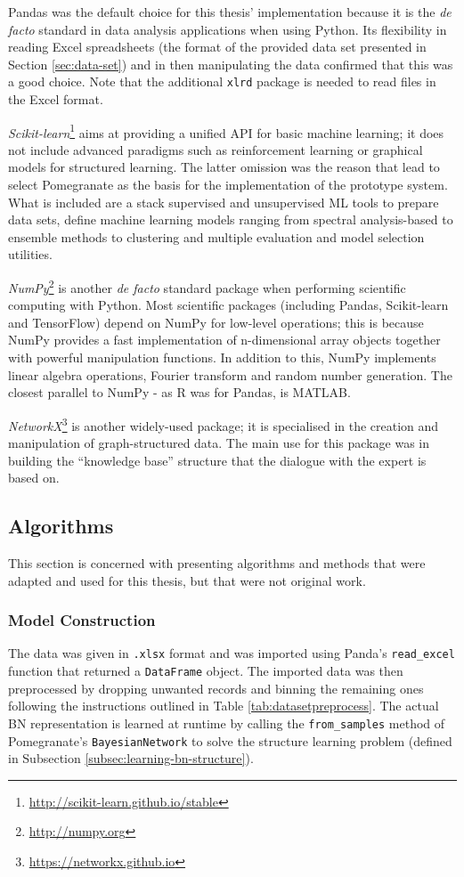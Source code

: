 Pandas was the default choice for this thesis' implementation because it is the \textit{de facto} standard in data analysis applications when using Python.
Its flexibility in reading Excel spreadsheets (the format of the provided data set presented in Section \ref{sec:data-set}) and in then manipulating the data confirmed that this was a good choice.
Note that the additional \texttt{xlrd} package is needed to read files in the Excel format.

\textit{Scikit-learn}\footnote{\url{http://scikit-learn.github.io/stable}} aims at providing a unified API for basic machine learning; it does not include advanced paradigms such as reinforcement learning or graphical models for structured learning.
The latter omission was the reason that lead to select Pomegranate as the basis for the implementation of the prototype system.
What is included are a stack supervised and unsupervised ML tools to prepare data sets, define machine learning models ranging from spectral analysis-based to ensemble methods to clustering and multiple evaluation and model selection utilities.

\textit{NumPy}\footnote{\url{http://numpy.org}} is another \textit{de facto} standard package when performing scientific computing with Python.
Most scientific packages (including Pandas, Scikit-learn and TensorFlow) depend on NumPy for low-level operations; this is because NumPy provides a fast implementation of n-dimensional array objects together with powerful manipulation functions.
In addition to this, NumPy implements linear algebra operations, Fourier transform and random number generation.
The closest parallel to NumPy - as R was for Pandas, is MATLAB.

\textit{NetworkX}\footnote{\url{https://networkx.github.io}} is another widely-used package; it is specialised in the creation and manipulation of graph-structured data.
The main use for this package was in building the \enquote{knowledge base} structure that the dialogue with the expert is based on.

\subsection{Algorithms} \label{subsec:algorithms}
This section is concerned with presenting algorithms and methods that were adapted and used for this thesis, but that were not original work.

\subsubsection{Model Construction}
The data was given in \texttt{.xlsx} format and was imported using Panda's \texttt{read\_excel} function that returned a \texttt{DataFrame} object.
The imported data was then preprocessed by dropping unwanted records and binning the remaining ones following the instructions outlined in Table \ref{tab:datasetpreprocess}.
The actual BN representation is learned at runtime by calling the \texttt{from\_samples} method of Pomegranate's \texttt{BayesianNetwork} to solve the structure learning problem (defined in Subsection \ref{subsec:learning-bn-structure}).

